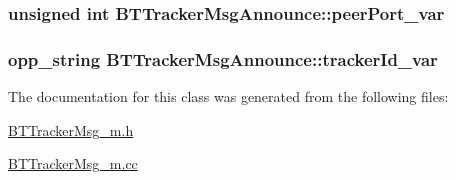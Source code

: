 \subsubsection[{peer\+Port\+\_\+var}]{\setlength{\rightskip}{0pt plus 5cm}unsigned int B\+T\+Tracker\+Msg\+Announce\+::peer\+Port\+\_\+var\hspace{0.3cm}{\ttfamily [protected]}}\label{classBTTrackerMsgAnnounce_a8284aedb73866bde651c42c6faf6b486}
\hypertarget{classBTTrackerMsgAnnounce_a1353228205f838d4de9c6e22bb2a6573}{}
\subsubsection[{tracker\+Id\+\_\+var}]{\setlength{\rightskip}{0pt plus 5cm}opp\+\_\+string B\+T\+Tracker\+Msg\+Announce\+::tracker\+Id\+\_\+var\hspace{0.3cm}{\ttfamily [protected]}}\label{classBTTrackerMsgAnnounce_a1353228205f838d4de9c6e22bb2a6573}


The documentation for this class was generated from the following files\+:\begin{DoxyCompactItemize}
\item 
\hyperlink{BTTrackerMsg__m_8h}{B\+T\+Tracker\+Msg\+\_\+m.\+h}\item 
\hyperlink{BTTrackerMsg__m_8cc}{B\+T\+Tracker\+Msg\+\_\+m.\+cc}\end{DoxyCompactItemize}
